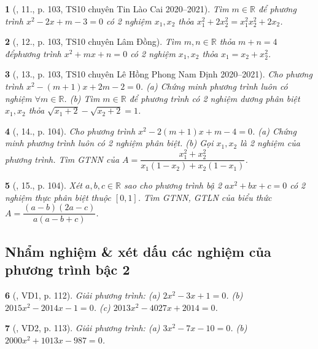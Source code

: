 \documentclass{article}
\newtheorem{baitoan}{}
\begin{document}
\begin{baitoan}[\cite{Thu_Viet_Minh_ptb2}, 11., p. 103, TS10 chuyên Tin Lào Cai 2020--2021]
	Tìm $m\in\mathbb{R}$ để phương trình $x^2 - 2x + m - 3 = 0$ có 2 nghiệm $x_1,x_2$ thỏa $x_1^2 + 2x_2^2 = x_1^2x_2^2 + 2x_2$.
\end{baitoan}

\begin{baitoan}[\cite{Thu_Viet_Minh_ptb2}, 12., p. 103, TS10 chuyên Lâm Đồng]
	Tìm $m,n\in\mathbb{R}$ thỏa $m + n = 4$ đểphương trình $x^2 + mx + n = 0$ có 2 nghiệm $x_1,x_2$ thỏa $x_1 = x_2 + x_2^2$.
\end{baitoan}

\begin{baitoan}[\cite{Thu_Viet_Minh_ptb2}, 13., p. 103, TS10 chuyên Lê Hồng Phong Nam Định 2020--2021]
	Cho phương trình $x^2 - (m + 1)x + 2m - 2 = 0$. (a) Chứng minh phương trình luôn có nghiệm $\forall m\in\mathbb{R}$. (b) Tìm $m\in\mathbb{R}$ để phương trình có 2 nghiệm dương phân biệt $x_1,x_2$ thỏa $\sqrt{x_1 + 2} - \sqrt{x_2 + 2} = 1$.
\end{baitoan}

\begin{baitoan}[\cite{Thu_Viet_Minh_ptb2}, 14., p. 104]
	Cho phương trình $x^2 - 2(m + 1)x + m - 4 = 0$. (a) Chứng minh phương trình luôn có 2 nghiệm phân biệt. (b) Gọi $x_1,x_2$ là 2 nghiệm của phương trình. Tìm {\rm GTNN} của $A = \dfrac{x_1^2 + x_2^2}{x_1(1 - x_2) + x_2(1 - x_1)}$.
\end{baitoan}

\begin{baitoan}[\cite{Thu_Viet_Minh_ptb2}, 15., p. 104]
	Xét $a,b,c\in\mathbb{R}$ sao cho phương trình bậ 2 $ax^2 + bx + c = 0$ có 2 nghiệm thực phân biệt thuộc $[0,1]$. Tìm {\rm GTNN, GTLN} của biểu thức $A = \dfrac{(a - b)(2a - c)}{a(a - b + c)}$.
\end{baitoan}

\subsection{Nhẩm nghiệm \& xét dấu các nghiệm của phương trình bậc 2}

\begin{baitoan}[\cite{Thu_Viet_Minh_ptb2}, VD1, p. 112]
	Giải phương trình: (a) $2x^2 - 3x + 1 = 0$. (b) $2015x^2 - 2014x - 1 = 0$. (c) $2013x^2 - 4027x + 2014 = 0$.
\end{baitoan}

\begin{baitoan}[\cite{Thu_Viet_Minh_ptb2}, VD2, p. 113]
	Giải phương trình: (a) $3x^2 - 7x - 10 = 0$. (b) $2000x^2 + 1013x - 987 = 0$.
\end{baitoan}
\end{document}

